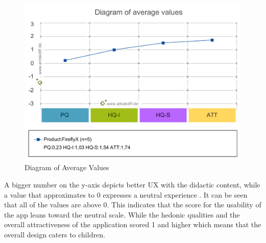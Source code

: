 \begin{figure}[H]
    \centering
    \includegraphics[width=14cm]{figures/NewFigures/Diagram_of_average_values.png}
    \caption{Diagram of Average Values}
    \label{fig:DiagramOfAverageValues}
\end{figure}

A bigger number on the y-axis depicts better UX with the didactic content, while a value that approximates to 0 expresses a neutral experience \cite{giardi2019evaluate}. It can be seen that all of the values are above 0. This indicates that the score for the usability of the app leans toward the neutral scale. While the hedonic qualities and the overall attractiveness of the application scored 1 and higher which means that the overall design caters to children.


